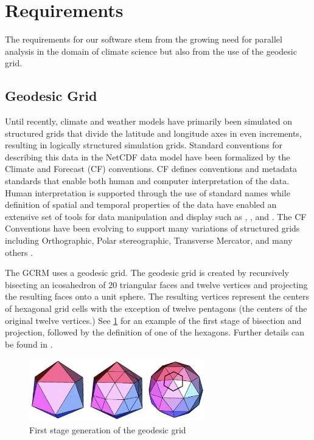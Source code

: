 \section{Requirements}
\label{section:requirements}

The requirements for our software stem from the growing need for parallel
analysis in the domain of climate science\cite{MODSIM07:LOT} but also from
the use of the geodesic grid.

\subsection{Geodesic Grid}
\label{subsection:grid}

Until recently, climate and weather models have primarily been simulated on
structured grids that divide the latitude and longitude axes in even
increments, resulting in logically structured simulation grids. Standard
conventions for describing this data in the NetCDF data model have been
formalized by the Climate and Forecast (CF) conventions. CF defines
conventions and metadata standards that enable both human and computer
interpretation of the data.  Human interpretation is supported through the use
of standard names while definition of spatial and temporal properties of the
data have enabled an extensive set of tools for data manipulation and display
such as \cite{NCO}, \cite{OPeNDAP}, and \cite{Ferret}.  The CF Conventions
have been evolving to support many variations of structured grids including
Orthographic, Polar stereographic, Transverse Mercator, and many others . 

The GCRM uses a geodesic grid.  The geodesic grid is created by recursively
bisecting an icosahedron of 20 triangular faces and twelve vertices and
projecting the resulting faces onto a unit sphere.  The resulting vertices
represent the centers of hexagonal grid cells with the exception of twelve
pentagons (the centers of the original twelve vertices.) See
\ref{fig:geodesic} for an example of the first stage of bisection and
projection, followed by the definition of one of the hexagons.  Further
details can be found in \cite{GEODESIC}.

\begin{figure}[!t]
\center
\includegraphics[width=3in]{images/geodesic2}
\caption{First stage generation of the geodesic grid}
\label{fig:geodesic}
\end{figure}

